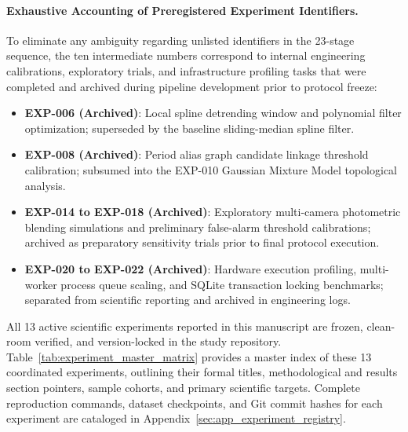 \paragraph{Exhaustive Accounting of Preregistered Experiment Identifiers.}
To eliminate any ambiguity regarding unlisted identifiers in the 23-stage sequence, the ten intermediate numbers correspond to internal engineering calibrations, exploratory trials, and infrastructure profiling tasks that were completed and archived during pipeline development prior to protocol freeze:
\begin{itemize}
    \item \textbf{EXP-006 (Archived)}: Local spline detrending window and polynomial filter optimization; superseded by the baseline sliding-median spline filter.
    \item \textbf{EXP-008 (Archived)}: Period alias graph candidate linkage threshold calibration; subsumed into the EXP-010 Gaussian Mixture Model topological analysis.
    \item \textbf{EXP-014 to EXP-018 (Archived)}: Exploratory multi-camera photometric blending simulations and preliminary false-alarm threshold calibrations; archived as preparatory sensitivity trials prior to final protocol execution.
    \item \textbf{EXP-020 to EXP-022 (Archived)}: Hardware execution profiling, multi-worker process queue scaling, and SQLite transaction locking benchmarks; separated from scientific reporting and archived in engineering logs.
\end{itemize}
All 13 active scientific experiments reported in this manuscript are frozen, clean-room verified, and version-locked in the study repository. Table~\ref{tab:experiment_master_matrix} provides a master index of these 13 coordinated experiments, outlining their formal titles, methodological and results section pointers, sample cohorts, and primary scientific targets. Complete reproduction commands, dataset checkpoints, and Git commit hashes for each experiment are cataloged in Appendix~\ref{sec:app_experiment_registry}.

